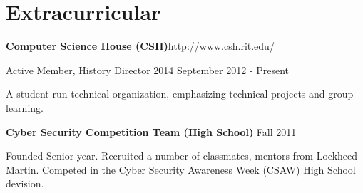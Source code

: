 \documentclass[letter,margin,line]{resume}
\newcommand{\rurl}[1]{\hfill {\footnotesize \url{#1}}}
\begin{document}
\begin{resume}
\begin{asparablank}
	\end{asparablank}
\section{\mysidestyle Extracurricular}
\begin{asparablank}
	\item {\bf Computer Science House ({\small CSH})}\rurl{http://www.csh.rit.edu/}
	\small	\item Active Member, History Director 2014 \hfill September 2012 - Present
	\item A student run technical organization, emphasizing technical projects and group learning. 
	\\
	\item {\bf Cyber Security Competition Team ({\small High School})} \hfill Fall 2011
	\small \item Founded Senior year. Recruited a number of classmates, mentors from Lockheed Martin. Competed in the Cyber Security Awareness Week (CSAW) High School devision. 
\end{asparablank}
\end{resume}
\end{document}
